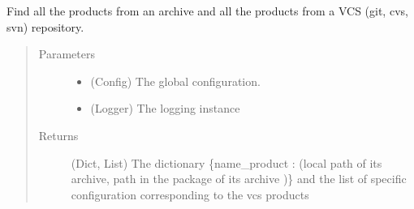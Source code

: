 \documentclass[a4paper,10pt,english]{sphinxmanual}
\begin{document}

\begin{fulllineitems}
\label{\detokenize{apidoc_commands/commands:commands.package.get_archives}}
Find all the products from an archive and all the products
from a VCS (git, cvs, svn) repository.
\begin{quote}\begin{description}
\item[{Parameters}] \leavevmode\begin{itemize}
\item {} 
 \textendash{} (Config) The global configuration.

\item {} 
 \textendash{} (Logger) The logging instance

\end{itemize}

\item[{Returns}] \leavevmode
(Dict, List)
The dictionary 
\{name\_product : (local path of its archive, path in the package of its archive )\}
and the list of specific configuration corresponding to the vcs products

\end{description}\end{quote}

\end{fulllineitems}

\end{document}
